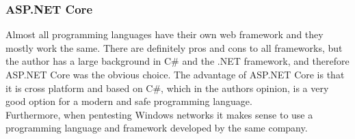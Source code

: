 \documentclass{article}
\begin{document}
\subsubsection{ASP.NET Core}
Almost all programming languages have their own web framework and they mostly work the same. There are definitely pros and cons to all frameworks, but the author has a large background in C\# and the .NET framework, and therefore ASP.NET Core was the obvious choice. The advantage of ASP.NET Core is that it is cross platform\cite{url:implementation:aspnet-core} and based on C\#, which in the authors opinion, is a very good option for a modern and safe programming language.\\
Furthermore, when pentesting Windows networks it makes sense to use a programming language and framework developed by the same company.
\end{document}

